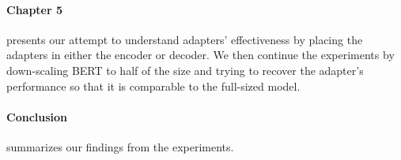 \paragraph{Chapter 5} presents our attempt to understand adapters' effectiveness by placing the adapters in either the encoder or decoder. We then continue the experiments by down-scaling BERT to half of the size and trying to recover the adapter's performance so that it is comparable to the full-sized model.

\paragraph{Conclusion} summarizes our findings from the experiments.